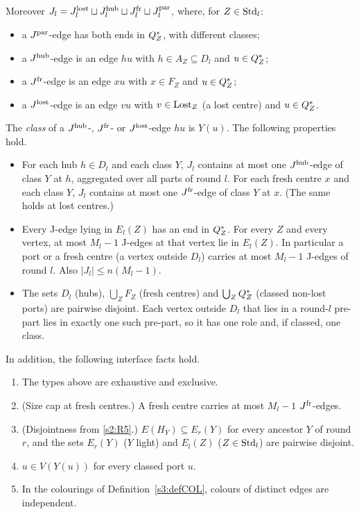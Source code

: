\begin{lemma}
Moreover $J_l=J^{\mathrm{lost}}_l\sqcup J^{\mathrm{hub}}_l\sqcup J^{\mathrm{fr}}_l\sqcup J^{\mathrm{par}}_l$, where, for $Z\in\mathrm{Std}_l$:
\begin{itemize}
\item a $J^{\mathrm{par}}$-edge has both ends in $Q^{*}_Z$, with different classes;
\item a $J^{\mathrm{hub}}$-edge is an edge $hu$ with $h\in A_Z\subseteq D_l$ and $u\in Q^{*}_Z$;
\item a $J^{\mathrm{fr}}$-edge is an edge $xu$ with $x\in F_Z$ and $u\in Q^{*}_Z$;
\item a $J^{\mathrm{lost}}$-edge is an edge $vu$ with $v\in\mathrm{Lost}_Z$ (a lost centre) and $u\in Q^{*}_Z$.
\end{itemize}
The \emph{class} of a $J^{\mathrm{hub}}$-, $J^{\mathrm{fr}}$- or $J^{\mathrm{lost}}$-edge $hu$ is $Y(u)$. The following properties hold.
\begin{itemize}
\item[\Jp{1}] For each hub $h\in D_l$ and each class $Y$, $J_l$ contains at most one $J^{\mathrm{hub}}$-edge of class $Y$ at $h$, aggregated over all parts of round $l$. For each fresh centre $x$ and each class $Y$, $J_l$ contains at most one $J^{\mathrm{fr}}$-edge of class $Y$ at $x$. (The same holds at lost centres.)
\item[\Jp{2}] Every J-edge lying in $E_l(Z)$ has an end in $Q^{*}_Z$. For every $Z$ and every vertex, at most $M_l-1$ J-edges at that vertex lie in $E_l(Z)$. In particular a port or a fresh centre (a vertex outside $D_l$) carries at most $M_l-1$ J-edges of round $l$. Also $|J_l|\le n(M_l-1)$.
\item[\Jp{3}] The sets $D_l$ (hubs), $\bigcup_ZF_Z$ (fresh centres) and $\bigcup_ZQ^{*}_Z$ (classed non-lost ports) are pairwise disjoint. Each vertex outside $D_l$ that lies in a round-$l$ pre-part lies in exactly one such pre-part, so it has one role and, if classed, one class.
\end{itemize}
In addition, the following interface facts hold.
\begin{enumerate}
\item[(i)] The types above are exhaustive and exclusive.
\item[(ii)] (Size cap at fresh centres.) A fresh centre carries at most $M_l-1$ $J^{\mathrm{fr}}$-edges.
\item[(iii)] (Disjointness from \ref{s2:R5}.) $E(H_Y)\subseteq E_{r}(Y)$ for every ancestor $Y$ of round $r$, and the sets $E_r(Y)$ ($Y$ light) and $E_l(Z)$ ($Z\in\mathrm{Std}_l$) are pairwise disjoint.
\item[(iv)] $u\in V(Y(u))$ for every classed port $u$.
\item[(v)] In the colourings of Definition~\ref{s3:defCOL}, colours of distinct edges are independent.
\end{enumerate}
\deps{\ref{s6:lemJSLC}, \ref{s6:lemPAR}, \ref{s6:defDesign}, \ref{s2:propStructure}, \ref{s2:lemEL}, \ref{s2:lemCap}, \ref{s3:defCOL}, \ref{s2:defHBtp}, \ref{s6:lemHCCP}, \ref{s6:defLending}}
\end{lemma}

